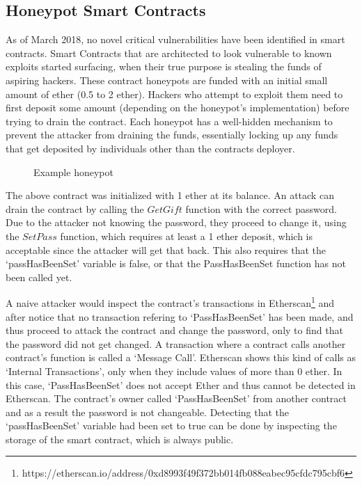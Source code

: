 \subsection{Honeypot Smart Contracts}
As of March 2018, no novel critical vulnerabilities have been identified in smart contracts. Smart Contracts that are architected to look vulnerable to known exploits started surfacing, when their true purpose is stealing the funds of aspiring hackers. These contract honeypots are funded with an initial small amount of ether (0.5 to 2 ether). Hackers who attempt to exploit them need to first deposit some amount (depending on the honeypot's implementation) before trying to drain the contract. Each honeypot has a well-hidden mechanism to prevent the attacker from draining the funds, essentially locking up any funds that get deposited by individuals other than the contracts deployer. 

\begin{figure}[H]
    \centering
    
    \caption{Example honeypot}
    \label{smart_contract}
\end{figure}

The above contract was initialized with 1 ether at its balance. An attack can drain the contract by calling the $GetGift$ function with the correct password. Due to the attacker not knowing the password, they proceed to change it, using the $SetPass$ function, which requires at least a 1 ether deposit, which is acceptable since the attacker will get that back. This also requires that the `passHasBeenSet' variable is false, or that the PassHasBeenSet function has not been called yet.

A naive attacker would inspect the contract's transactions in Etherscan\footnote{https://etherscan.io/address/0xd8993f49f372bb014fb088eabec95cfdc795cbf6} and after notice that no transaction refering to `PassHasBeenSet' has been made, and thus proceed to attack the contract and change the password, only to find that the password did not get changed. A transaction where a contract calls another contract's function is called a `Message Call'. Etherscan shows this kind of calls as `Internal Transactions', only when they include values of more than 0 ether. In this case, `PassHasBeenSet' does not accept Ether and thus cannot be detected in Etherscan. The contract's owner called `PassHasBeenSet' from another contract and as a result the password is not changeable. Detecting that the `passHasBeenSet' variable had been set to true can be done by inspecting the storage of the smart contract, which is always public.


